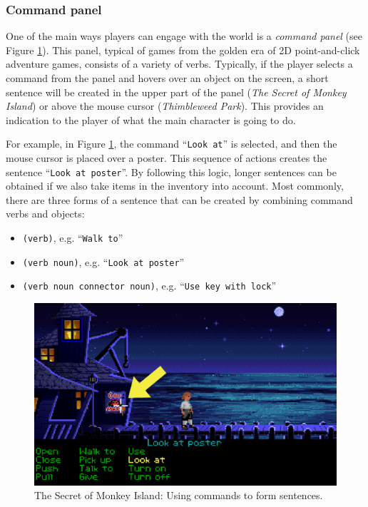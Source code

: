 \subsubsection{Command panel}
\label{ActionPanel}
One of the main ways players can engage with the world is a \textit{command panel} (see Figure \ref{fig:C-TSoMI}). This panel, typical of games from the golden era of 2D point-and-click adventure games, consists of a variety of verbs. Typically, if the player selects a command from the panel and hovers over an object on the screen, a short sentence will be created in the upper part of the panel (\textit{The Secret of Monkey Island}) or above the mouse cursor (\textit{Thimbleweed Park}). This provides an indication to the player of what the main character is going to do. 

For example, in Figure \ref{fig:C-TSoMI}, the command “\texttt{Look at}” is selected, and then the mouse cursor is placed over a poster. This sequence of actions creates the sentence “\texttt{Look at poster}”. By following this logic, longer sentences can be obtained if we also take items in the inventory into account. Most commonly, there are three forms of a sentence that can be created by combining command verbs and objects:
\begin{itemize}
    \item \verb|(verb)|, e.g. “\texttt{Walk to}”
    \item \verb|(verb noun)|, e.g. “\texttt{Look at poster}”
    \item \verb|(verb noun connector noun)|, e.g. “\texttt{Use key with lock}”
\end{itemize}

\begin{figure}[H]
\centering
\includegraphics[width=.8\linewidth]{img/C-TSoMI.png}
\caption{The Secret of Monkey Island: Using commands to form sentences.}
\label{fig:C-TSoMI}
\end{figure}
 
